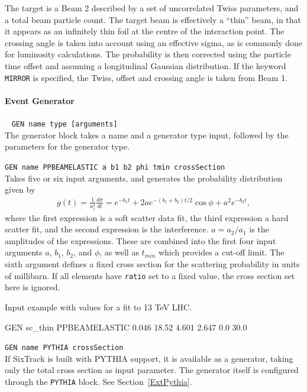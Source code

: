 The target is a Beam 2 described by a set of uncorrelated Twiss parameters, and a total beam particle count.
The target beam is effectively a ``thin'' beam, in that it appears as an infinitely thin foil at the centre of the interaction point.
The crossing angle is taken into account using an effective sigma, as is commonly done for luminosity calculations.
The probability is then corrected using the particle time offset and assuming a longitudinal Gaussian distribution.
If the keyword \texttt{MIRROR} is specified, the Twiss, offset and crossing angle is taken from Beam 1.

\paragraph{Event Generator}~ \texttt{GEN name type [arguments]} \\

The generator block takes a name and a generator type input, followed by the parameters for the
generator type.

\bigskip
\noindent\texttt{GEN name PPBEAMELASTIC a b1 b2 phi tmin crossSection} \\

Takes five or six input arguments, and generates the probability distribution given by
\begin{align}
    g(t) = \frac{1}{a_1^2}\frac{d\sigma}{dt} = e^{-b_1 t}+ 2ae^{-(b_1+b_2)t/2}\cos{\phi} + a^2e^{-b_2 t},
\end{align}
where the first expression is a soft scatter data fit, the third expression a hard scatter fit, and the second expression is the interference. $a = a_2/a_1$ is the amplitudes of the expressions.
These are combined into the first four input arguments $a$, $b_1$, $b_2$, and $\phi$, as well as $t_{min}$ which provides a cut-off limit.
The sixth argument defines a fixed cross section for the scattering probability in units of millibarn.
If all elements have \texttt{ratio} set to a fixed value, the cross section set here is ignored.

Input example with values for a fit to 13 TeV LHC.
\begin{cverbatim}
GEN  sc_thin     PPBEAMELASTIC 0.046 18.52 4.601 2.647 0.0 30.0
\end{cverbatim}

\bigskip
\noindent\texttt{GEN name PYTHIA crossSection} \\

If SixTrack is built with PYTHIA support, it is available as a generator, taking only the total cross section as input parameter.
The generator itself is configured through the \texttt{PYTHIA} block.
See Section~\ref{ExtPythia}.

